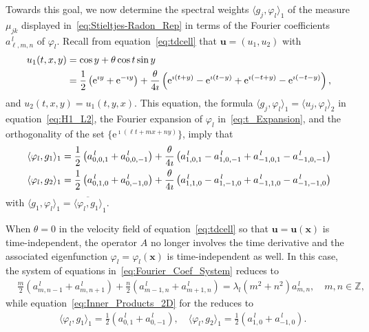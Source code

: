 \documentclass[leqno,onefignum,onetabnum]{siamltex1213}
\newcommand{\e}{\mathrm{e}}
\newcommand{\vecx}{\boldsymbol{x}}
\newcommand{\vecu}{\boldsymbol{u}}
\begin{document}
Towards this goal, we now determine the spectral weights $\langle
g_j,\varphi_l\rangle_1$ of the measure $\mu_{jk}$ displayed
in~\eqref{eq:Stieltjes-Radon_Rep} in terms of the Fourier coefficients
$a^{\,l}_{\ell,m,n}$ of $\varphi_l$. Recall from equation~\eqref{eq:tdcell}
that $\vecu=(u_1,u_2)$ with
%
\begin{align}
  u_1(t,x,y)&=\cos{y}+\theta\cos{t}\sin{y}\\ 
           &=\frac{1}{2}\left(\e^{\imath y}+\e^{-\imath y}\right)
            +\frac{\theta}{4\imath}\left(\e^{\imath(t+y)}-\e^{\imath(t-y)}+\e^{\imath(-t+y)}-\e^{\imath(-t-y)}\right),
            \notag
\end{align}
%
and $u_2(t,x,y)=u_1(t,y,x)$. This equation, the formula $\langle
g_j,\varphi_l\rangle_1=\langle u_j,\varphi_l\rangle_2$ in equation~\eqref{eq:H1_L2}, the Fourier 
expansion of $\varphi_l$ in~\eqref{eq:t_Expansion}, and the orthogonality of
the set $\{\e^{\imath(\ell t+mx+ny)}\}$, imply that
%
\begin{align}\label{eq:Inner_Products_2D}
  \langle\varphi_l,g_1\rangle_1=\frac{1}{2}\left(a^{\,l}_{0,0,1}+a^{\,l}_{0,0,-1}\right)
               +\frac{\theta}{4\imath}\left(a^{\,l}_{1,0,1}-a^{\,l}_{1,0,-1}+a^{\,l}_{-1,0,1}-a^{\,l}_{-1,0,-1}\right) 
               \\
  \langle\varphi_l,g_2\rangle_1=\frac{1}{2}\left(a^{\,l}_{0,1,0}+a^{\,l}_{0,-1,0}\right)
               +\frac{\theta}{4\imath}\left(a^{\,l}_{1,1,0}-a^{\,l}_{1,-1,0}+a^{\,l}_{-1,1,0}-a^{\,l}_{-1,-1,0}\right)
               \notag
\end{align}
%
with $\langle g_1,\varphi_l\rangle_1=\overline{\langle\varphi_l,g_1\rangle}_1$.



When $\theta=0$ in the velocity field of equation~\eqref{eq:tdcell} so that
$\vecu=\vecu(\vecx)$ is time-independent, the
operator $A$ no longer involves the time derivative and the associated
eigenfunction $\varphi_l=\varphi_l(\vecx)$ is time-independent as well. In this case, the 
system of equations in~\eqref{eq:Fourier_Coef_System} reduces to
%
\begin{align}\label{eq:Fourier_Coef_System_Steady}
  &\frac{m}{2}(a^{\,l}_{m,n-1}+a^{\,l}_{m,n+1})+\frac{n}{2}(a^{\,l}_{m-1,n}+a^{\,l}_{m+1,n})=\lambda_l(m^2+n^2)a^{\,l}_{m,n},
  \quad m,n\in\mathbb{Z},  
\end{align}
%
while equation~\eqref{eq:Inner_Products_2D} for the reduces to
%
\begin{align}\label{eq:Inner_Products_2D_Steady}
  &\langle\varphi_l,g_1\rangle_1=\frac{1}{2}\left(a^{\,l}_{0,1}+a^{\,l}_{0,-1}\right),
  \quad
  \langle\varphi_l,g_2\rangle_1=\frac{1}{2}\left(a^{\,l}_{1,0}+a^{\,l}_{-1,0}\right).
\end{align}
%
\end{document}

